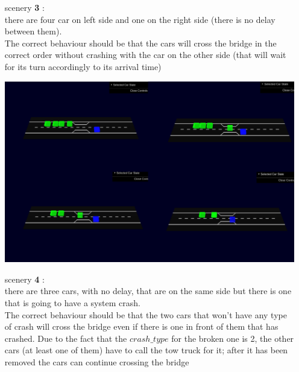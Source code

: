 \begin{itemize}
\begin{center}
    \end{center}
    \item[scenery \textbf{3}]: \\ there are four car on left side and one on the right side (there is no delay 
    between them).\\ The correct behaviour should be that the cars will cross the bridge in the correct 
    order without crashing with the car on the other side (that will wait for its turn accordingly
    to its arrival time) \\
    \begin{center}
        \includegraphics[scale=0.3, width=\linewidth]{assets/sc3.jpg}
    \end{center}
    \item[scenery \textbf{4}]: \\ there are three cars, with no delay, that are on the same side but there is one that is going to
    have a system crash.\\ The correct behaviour should be that the two cars that won't have any type of crash
    will cross the bridge even if there is one in front of them that has crashed. Due to the fact that the 
    $crash\_type$ for the broken one is 2, the other cars (at least one of them) have to call the tow truck for 
    it; after it has been removed the cars can continue crossing the bridge \\
    \begin{center}

\end{center}
\end{itemize}
